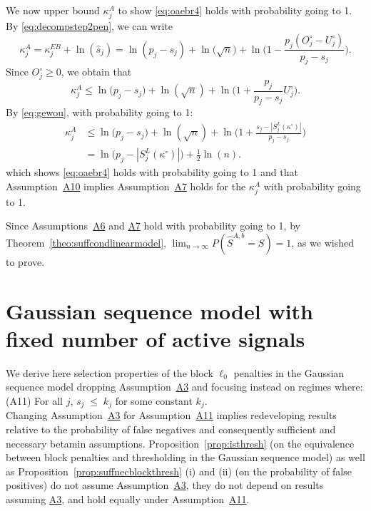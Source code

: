 \documentclass[bj,authoryear]{imsart}
\theoremstyle{plain}
\begin{document}
We now upper bound $\kappa^{A}_j$ to show \eqref{eq:oaebr4} holds with probability going to 1. By \eqref{eq:decompstep2pen}, we can write
    $$\kappa_j^{A}=\kappa_j^{EB}+\ln(\widehat s_j)= \ln(p_j-s_j)+\ln\big(\sqrt{n}\big)+\ln\Big(1-\frac{p_j(O^{\circ}_j-U^{\circ}_j)}{p_j-s_j}\Big).$$
Since $O_j^{\circ} \geq 0$, we obtain that %
\begin{equation*}
    \kappa^{A}_j \leq \ln\big(p_j-s_j\big)+\ln(\sqrt{n})+\ln\bigg(1+\frac{p_j}{p_j-s_j}U^{\circ}_j\bigg).
\end{equation*}
By \eqref{eq:gewou}, with probability going to 1:
\begin{align}\label{eq:finalupperboundkappaj2}
    \kappa_j^A &\leq  \ln\big(p_j-s_j\big)+\ln(\sqrt{n})+\ln\bigg(1+\frac{s_j-|S^{L}_j(\kappa^{\circ})|}{p_j-s_j}\bigg)\nonumber\\
    &= \ln\big(p_j-|S^{L}_j(\kappa^{\circ})|\big)+\frac{1}{2}\ln(n).
\end{align}
which shows \eqref{eq:oaebr4} holds with probability going to 1 and that
Assumption~\hyperlink{lab:A10}{A10} implies Assumption~\hyperlink{lab:A7}{A7} holds for the $\kappa^{A}_j$ with probability going to 1. 

Since Assumptions~\hyperlink{lab:A6}{A6} and \hyperlink{lab:A7}{A7} hold with probability going to 1, by Theorem~\ref{theo:suffcondlinearmodel}, $\lim_{n\to\infty}P(\hat{S}^{A,b}= S)= 1$, as we wished to prove.

\section{Gaussian sequence model with fixed number of active signals}\label{suppsec:appendixGSMsfinite}

We derive here selection properties of the block $\ell_0$ penalties in the Gaussian sequence model dropping Assumption~\hyperlink{lab:A3}{A3} and focusing instead on regimes where:\\[5pt]
\hypertarget{lab:A11}{(A11)} \quad For all $j$, \;$s_j \;\leq\;k_j$ for some constant $k_j$.\\[5pt]
Changing Assumption~\hyperlink{lab:A3}{A3} for Assumption~\hyperlink{lab:A11}{A11} implies redeveloping results relative to the probability of false negatives and consequently sufficient and necessary betamin assumptions. Proposition~\ref{prop:isthresh} (on the equivalence between block penalties and thresholding in the Gaussian sequence model) as well as Proposition~\ref{prop:suffnecblockthresh} (i) and (ii) (on the probability of false positives) do not assume Assumption~\hyperlink{lab:A3}{A3}, they do not depend on results assuming \hyperlink{lab:A3}{A3}, and hold equally under Assumption~\hyperlink{lab:A11}{A11}.
\end{document}
